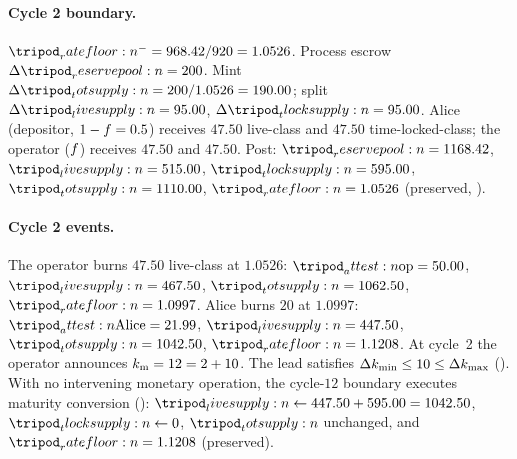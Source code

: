 \documentclass[../main.tex]{subfiles}
\begin{document}
\paragraph{Cycle 2 boundary.}
\label{verif:walkthrough:boundary}
$\ratefloor{}^{-} = 968.42/920 = 1.0526$. Process escrow $\Delta\reservepool{} = 200$. Mint
$\Delta\totsupply{} = 200/1.0526 = 190.00$; split $\Delta\livesupply{} = 95.00$,
$\Delta\tlocksupply{} = 95.00$. Alice (depositor, $1-f = 0.5$) receives $47.50$
live-class and $47.50$ time-locked-class; the operator ($f$) receives $47.50$ and
$47.50$. Post: $\reservepool{} = 1168.42$, $\livesupply{} = 515.00$, $\tlocksupply{} =
595.00$, $\totsupply{} = 1110.00$, $\ratefloor{} = 1.0526$ (preserved,
).

\paragraph{Cycle 2 events.}
The operator burns $47.50$ live-class at $1.0526$: $\attest{\opidx} = 50.00$,
$\livesupply{} = 467.50$, $\totsupply{} = 1062.50$, $\ratefloor{} = 1.0997$. Alice burns $20$
at $1.0997$: $\attest{\mathrm{Alice}} = 21.99$, $\livesupply{} = 447.50$, $\totsupply{} =
1042.50$, $\ratefloor{} = 1.1208$. At cycle~2 the operator announces
$k\sb{\mathrm{m}}=12=2+10$. The lead satisfies $\Delta k\sb{\min} \leq 10 \leq \Delta k\sb{\max}$
(). With no intervening monetary operation, the
cycle-$12$ boundary executes maturity conversion ():
$\livesupply{} \gets 447.50 + 595.00 = 1042.50$, $\tlocksupply{} \gets 0$,
$\totsupply{}$ unchanged, and $\ratefloor{} = 1.1208$ (preserved).
\end{document}

